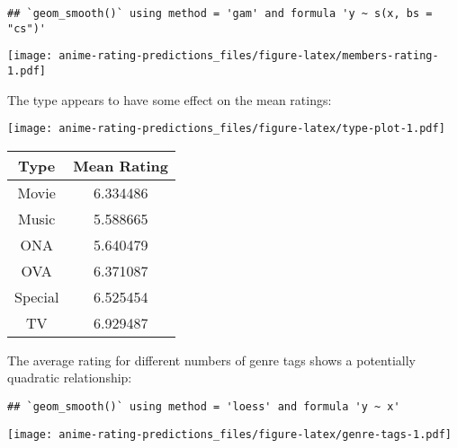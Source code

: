 \documentclass[
]{article}
\begin{document}
\begin{verbatim}
## `geom_smooth()` using method = 'gam' and formula 'y ~ s(x, bs = "cs")'
\end{verbatim}

\texttt{[image: anime-rating-predictions\_files/figure-latex/members-rating-1.pdf]}

The type appears to have some effect on the mean ratings:

\texttt{[image: anime-rating-predictions\_files/figure-latex/type-plot-1.pdf]}

\begin{longtable}[]{@{}cc@{}}
\toprule
Type & Mean Rating\tabularnewline
\midrule
\endhead
Movie & 6.334486\tabularnewline
Music & 5.588665\tabularnewline
ONA & 5.640479\tabularnewline
OVA & 6.371087\tabularnewline
Special & 6.525454\tabularnewline
TV & 6.929487\tabularnewline
\bottomrule
\end{longtable}

The average rating for different numbers of genre tags shows a
potentially quadratic relationship:

\begin{verbatim}
## `geom_smooth()` using method = 'loess' and formula 'y ~ x'
\end{verbatim}

\texttt{[image: anime-rating-predictions\_files/figure-latex/genre-tags-1.pdf]}
\end{document}
